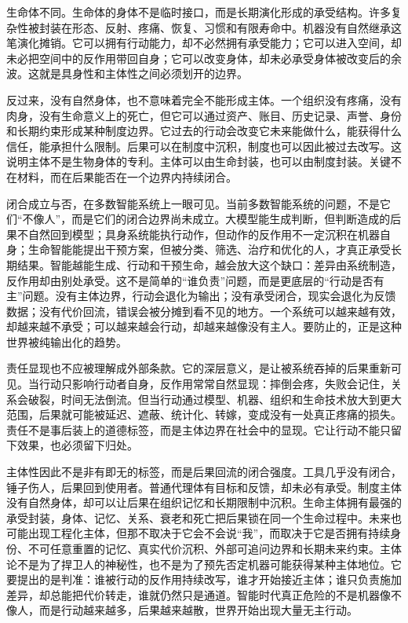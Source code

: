 生命体不同。生命体的身体不是临时接口，而是长期演化形成的承受结构。许多复杂性被封装在形态、反射、疼痛、恢复、习惯和有限寿命中。机器没有自然继承这笔演化摊销。它可以拥有行动能力，却不必然拥有承受能力；它可以进入空间，却未必把空间中的反作用带回自身；它可以改变身体，却未必承受身体被改变后的余波。这就是具身性和主体性之间必须划开的边界。

反过来，没有自然身体，也不意味着完全不能形成主体。一个组织没有疼痛，没有肉身，没有生命意义上的死亡，但它可以通过资产、账目、历史记录、声誉、身份和长期约束形成某种制度边界\cite{dewey1926historic}。它过去的行动会改变它未来能做什么，能获得什么信任，能承担什么限制。后果可以在制度中沉积，制度也可以因此被过去改写。这说明主体不是生物身体的专利。主体可以由生命封装，也可以由制度封装。关键不在材料，而在后果能否在一个边界内持续闭合。


闭合成立与否，在多数智能系统上一眼可见。当前多数智能系统的问题，不是它们“不像人”，而是它们的闭合边界尚未成立。大模型能生成判断，但判断造成的后果不自然回到模型；具身系统能执行动作，但动作的反作用不一定沉积在机器自身；生命智能能提出干预方案，但被分类、筛选、治疗和优化的人，才真正承受长期结果。智能越能生成、行动和干预生命，越会放大这个缺口：差异由系统制造，反作用却由别处承受。这不是简单的“谁负责”问题，而是更底层的“行动是否有主”问题。没有主体边界，行动会退化为输出；没有承受闭合，现实会退化为反馈数据；没有代价回流，错误会被分摊到看不见的地方。一个系统可以越来越有效，却越来越不承受；可以越来越会行动，却越来越像没有主人。要防止的，正是这种世界被纯输出化的趋势。

责任显现也不应被理解成外部条款。它的深层意义，是让被系统吞掉的后果重新可见。当行动只影响行动者自身，反作用常常自然显现：摔倒会疼，失败会记住，关系会破裂，时间无法倒流。但当行动通过模型、机器、组织和生命技术放大到更大范围，后果就可能被延迟、遮蔽、统计化、转嫁，变成没有一处真正疼痛的损失\cite{matthias2004responsibility}。责任不是事后装上的道德标签，而是主体边界在社会中的显现。它让行动不能只留下效果，也必须留下归处。

主体性因此不是非有即无的标签，而是后果回流的闭合强度。工具几乎没有闭合，锤子伤人，后果回到使用者。普通代理体有目标和反馈，却未必有承受。制度主体没有自然身体，却可以让后果在组织记忆和长期限制中沉积。生命主体拥有最强的承受封装，身体、记忆、关系、衰老和死亡把后果锁在同一个生命过程中。未来也可能出现工程化主体，但那不取决于它会不会说“我”，而取决于它是否拥有持续身份、不可任意重置的记忆、真实代价沉积、外部可追问边界和长期未来约束\cite{parfit1984reasons}。主体论不是为了捍卫人的神秘性，也不是为了预先否定机器可能获得某种主体地位。它要提出的是判准：谁被行动的反作用持续改写，谁才开始接近主体；谁只负责施加差异，却总能把代价转走，谁就仍然只是通道。智能时代真正危险的不是机器像不像人，而是行动越来越多，后果越来越散，世界开始出现大量无主行动。

